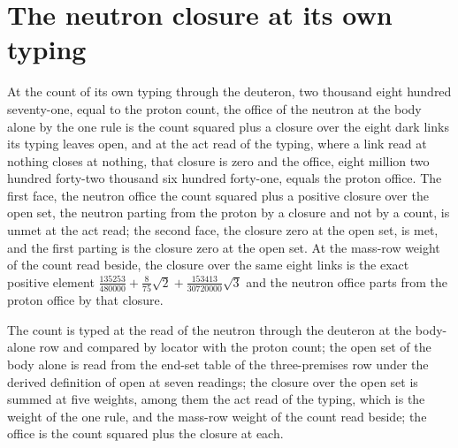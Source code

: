 \section{The neutron closure at its own typing}\label{mod:I-5-D539893-w-tcln}
\begin{chwall}\label{box:I-5-D539893-w-tcln:1}
At the count of its own typing through the deuteron, two thousand eight hundred seventy-one, equal to the proton count, the office of the neutron at the body alone by the one rule is the count squared plus a closure over the eight dark links its typing leaves open, and at the act read of the typing, where a link read at nothing closes at nothing, that closure is zero and the office, eight million two hundred forty-two thousand six hundred forty-one, equals the proton office. The first face, the neutron office the count squared plus a positive closure over the open set, the neutron parting from the proton by a closure and not by a count, is unmet at the act read; the second face, the closure zero at the open set, is met, and the first parting is the closure zero at the open set. At the mass-row weight of the count read beside, the closure over the same eight links is the exact positive element $\tfrac{135253}{480000} + \tfrac{8}{75}\sqrt{2} + \tfrac{153413}{30720000}\sqrt{3}$ and the neutron office parts from the proton office by that closure.
\end{chwall}
The count is typed at the read of the neutron through the deuteron at the body-alone row and compared by locator with the proton count; the open set of the body alone is read from the end-set table of the three-premises row under the derived definition of open at seven readings; the closure over the open set is summed at five weights, among them the act read of the typing, which is the weight of the one rule, and the mass-row weight of the count read beside; the office is the count squared plus the closure at each.

